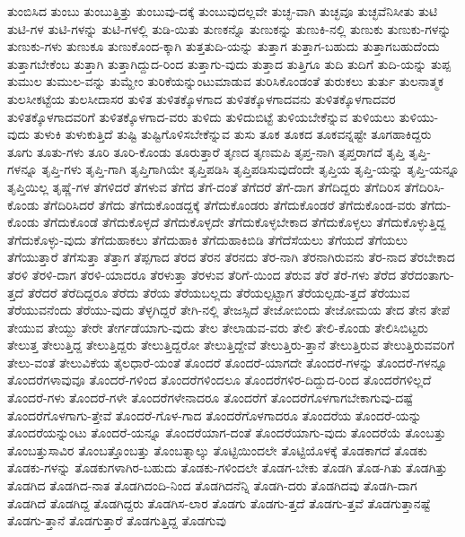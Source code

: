 {ತುಂಬಿಸಿದ
ತುಂಬು
ತುಂಬುತ್ತಿತ್ತು
ತುಂಬುವು-ದಕ್ಕೆ
ತುಂಬುವುದಲ್ಲವೇ
ತುಚ್ಛ-ವಾಗಿ
ತುಚ್ಛವೂ
ತುಚ್ಛವೆನಿಸೀತು
ತುಟಿ
ತುಟಿ-ಗಳ
ತುಟಿ-ಗಳನ್ನು
ತುಟಿ-ಗಳಲ್ಲಿ
ತುಡಿ-ಯಿತು
ತುಣಕನ್ನೊ
ತುಣುಕನ್ನು
ತುಣುಕಿ-ನಲ್ಲಿ
ತುಣುಕು
ತುಣುಕು-ಗಳನ್ನು
ತುಣುಕು-ಗಳು
ತುಣುಕೂ
ತುಣುಕೊಂದ-ಕ್ಕಾಗಿ
ತುತ್ತತುದಿ-ಯನ್ನು
ತುತ್ತಾಗ
ತುತ್ತಾಗ-ಬಹುದು
ತುತ್ತಾಗಬಹುದೆಂದು
ತುತ್ತಾಗಬೇಕೆಂಬ
ತುತ್ತಾಗಿ
ತುತ್ತಾಗಿದ್ದುದ-ರಿಂದ
ತುತ್ತಾಗು-ವುದು
ತುತ್ತಾದ
ತುತ್ತಿಗೂ
ತುದಿ
ತುದಿಗೆ
ತುದಿ-ಯನ್ನು
ತುಪ್ಪ
ತುಮುಲ
ತುಮುಲ-ವನ್ನು
ತುಮ್ಹೇಂ
ತುರಿಕೆಯನ್ನುಂಟುಮಾಡುವ
ತುರಿಸಿಕೊಂಡಂತೆ
ತುರುಕಲು
ತುರ್ತು
ತುಲನಾತ್ಮಕ
ತುಲಸೀಕಟ್ಟೆಯ
ತುಲಸೀದಾಸರ
ತುಳಿತ
ತುಳಿತಕ್ಕೊಳಗಾದ
ತುಳಿತಕ್ಕೊಳಗಾದವನು
ತುಳಿತಕ್ಕೊಳಗಾದವರ
ತುಳಿತಕ್ಕೊಳಗಾದವರಿಗೆ
ತುಳಿತಕ್ಕೊಳಗಾದ-ವರು
ತುಳಿದು
ತುಳಿದುಬಿಟ್ಟೆ
ತುಳಿಯಬೇಕೆನ್ನುವ
ತುಳಿಯಲು
ತುಳಿಯು-ವುದು
ತುಳುಕಿ
ತುಳುಕುತ್ತಿದೆ
ತುಷ್ಟಿ
ತುಷ್ಟಿಗೊಳಿಸಬೇಕೆನ್ನುವ
ತುಸು
ತೂಕ
ತೂಕದ
ತೂಕವನ್ನಷ್ಟೇ
ತೂಗಹಾಕಿದ್ದರು
ತೂಗು
ತೂತು-ಗಳು
ತೂರಿ
ತೂರಿ-ಕೊಂಡು
ತೂರುತ್ತಾರೆ
ತೃಣದ
ತೃಣಮಪಿ
ತೃಪ್ತ-ನಾಗಿ
ತೃಪ್ತರಾಗದೆ
ತೃಪ್ತಿ
ತೃಪ್ತಿ-ಗಳನ್ನೂ
ತೃಪ್ತಿ-ಗಳು
ತೃಪ್ತಿ-ಗಾಗಿ
ತೃಪ್ತಿಗಾಗಿಯೇ
ತೃಪ್ತಿಪಡಿಸಿ
ತೃಪ್ತಿಪಡಿಸುವುದೆಂದೇ
ತೃಪ್ತಿಯ
ತೃಪ್ತಿ-ಯನ್ನು
ತೃಪ್ತಿ-ಯನ್ನೂ
ತೃಪ್ತಿಯಿಲ್ಲ
ತೃಷ್ಣೆ-ಗಳ
ತೆಗಳಿದರೆ
ತೆಗಳುವ
ತೆಗೆದ
ತೆಗೆ-ದಂತೆ
ತೆಗೆದರೆ
ತೆಗೆ-ದಾಗ
ತೆಗೆದಿದ್ದರು
ತೆಗೆದಿರಿಸ
ತೆಗೆದಿರಿಸಿ-ಕೊಂಡು
ತೆಗೆದಿರಿಸಿದರೆ
ತೆಗೆದು
ತೆಗೆದುಕೊಂಡದ್ದಕ್ಕೆ
ತೆಗೆದುಕೊಂಡರು
ತೆಗೆದುಕೊಂಡರೆ
ತೆಗೆದುಕೊಂಡ-ವರು
ತೆಗೆದು-ಕೊಂಡು
ತೆಗೆದುಕೊಂಡೆ
ತೆಗೆದುಕೊಳ್ಳದೆ
ತೆಗೆದುಕೊಳ್ಳದೇ
ತೆಗೆದುಕೊಳ್ಳಬೇಕಾದ
ತೆಗೆದುಕೊಳ್ಳಲು
ತೆಗೆದುಕೊಳ್ಳುತ್ತಿದ್ದ
ತೆಗೆದುಕೊಳ್ಳು-ವುದು
ತೆಗೆದುಹಾಕಲು
ತೆಗೆದುಹಾಕಿ
ತೆಗೆದುಹಾಕಿಬಿಡಿ
ತೆಗೆದೆಸೆಯಲು
ತೆಗೆಯದೆ
ತೆಗೆಯಲು
ತೆಗೆಯುತ್ತಾರೆ
ತೆಗೆಸುತ್ತಾ
ತೆತ್ತಾಗ
ತೆಪ್ಪಗಾದ
ತೆರದ
ತೆರನ
ತೆರನದು
ತೆರ-ನಾಗಿ
ತೆರನಾಗಿರುವನು
ತೆರ-ನಾದ
ತೆರಬೇಕಾದ
ತೆರಳಿ
ತೆರಳಿ-ದಾಗ
ತೆರಳಿ-ಯಾದರೂ
ತೆರಳುತ್ತಾ
ತೆರಳುವ
ತೆರಿಗೆ-ಯಿಂದ
ತೆರುವ
ತೆರೆ
ತೆರೆ-ಗಳು
ತೆರೆದ
ತೆರೆದಂತಾಗು-ತ್ತದೆ
ತೆರೆದರೆ
ತೆರೆದಿದ್ದರೂ
ತೆರೆದು
ತೆರೆಯ
ತೆರೆಯಬಲ್ಲದು
ತೆರೆಯಲ್ಪಟ್ಟಾಗ
ತೆರೆಯಲ್ಪಡು-ತ್ತದೆ
ತೆರೆಯುವ
ತೆರೆಯುವನೆಂದು
ತೆರೆಯು-ವುದು
ತೆಳ್ಳಗಿದ್ದರೆ
ತೇಗಿ-ನಲ್ಲಿ
ತೇಜಸ್ಸಿದೆ
ತೇಜೋಬಿಂದು
ತೇಜೋಮಯ
ತೇದ
ತೇನ
ತೇಪೆ
ತೇಯುವ
ತೇಯ್ದು
ತೇರೇ
ತೇರ್ಗಡೆಯಾಗು-ವುದು
ತೇಲ
ತೇಲಾಡುವ-ವರು
ತೇಲಿ
ತೇಲಿ-ಕೊಂಡು
ತೇಲಿಸಿಬಿಟ್ಟರು
ತೇಲುತ್ತ
ತೇಲುತ್ತಿದ್ದ
ತೇಲುತ್ತಿದ್ದರು
ತೇಲುತ್ತಿದ್ದರೋ
ತೇಲುತ್ತಿದ್ದೇವೆ
ತೇಲುತ್ತಿರು-ತ್ತಾನೆ
ತೇಲುತ್ತಿರುವ
ತೇಲುತ್ತಿರುವವರಿಗೆ
ತೇಲು-ವಂತೆ
ತೇಲುವಿಕೆಯ
ತೈಲಧಾರೆ-ಯಂತೆ
ತೊಂದರೆ
ತೊಂದರೆ-ಯಾಗದೇ
ತೊಂದರೆ-ಗಳನ್ನು
ತೊಂದರೆ-ಗಳನ್ನೂ
ತೊಂದರೆಗಳಾವುವೂ
ತೊಂದರೆ-ಗಳಿಂದ
ತೊಂದರೆಗಳಿಂದಲೂ
ತೊಂದರೆಗಳಿರ-ದಿದ್ದುದ-ರಿಂದ
ತೊಂದರೆಗಳಿಲ್ಲದೆ
ತೊಂದರೆ-ಗಳು
ತೊಂದರೆ-ಗಳೇ
ತೊಂದರೆಗಳೇನಾದರೂ
ತೊಂದರೆಗೆ
ತೊಂದರೆಗೊಳಗಾಗಬೇಕಾಗುವು-ದಷ್ಟೆ
ತೊಂದರೆಗೊಳಗಾಗು-ತ್ತೇವೆ
ತೊಂದರೆ-ಗೊಳ-ಗಾದ
ತೊಂದರೆಗೊಳಗಾದರೂ
ತೊಂದರೆಯ
ತೊಂದರೆ-ಯನ್ನು
ತೊಂದರೆಯನ್ನುಂಟು
ತೊಂದರೆ-ಯನ್ನೂ
ತೊಂದರೆಯಾಗ-ದಂತೆ
ತೊಂದರೆಯಾಗು-ವುದು
ತೊಂದರೆಯೆ
ತೊಂಬತ್ತು
ತೊಂಬತ್ತುಸಾವಿರ
ತೊಂಬತ್ತೊಂಬತ್ತು
ತೊಂಬತ್ನಾಲ್ಕು
ತೊಟ್ಟಿಯಿಂದಲೇ
ತೊಟ್ಟಿಯೊಳಕ್ಕೆ
ತೊಡಕಾಗದೆ
ತೊಡಕು
ತೊಡಕು-ಗಳನ್ನು
ತೊಡಕುಗಳಾಗಿರ-ಬಹುದು
ತೊಡಕು-ಗಳಿಂದಲೇ
ತೊಡಗ-ಬೇಕು
ತೊಡಗಿ
ತೊಡ-ಗಿತು
ತೊಡಗಿತ್ತು
ತೊಡಗಿದ
ತೊಡಗಿದ-ನಾತ
ತೊಡಗಿದಂದಿ-ನಿಂದ
ತೊಡಗಿದನೆನ್ನಿ
ತೊಡಗಿ-ದರು
ತೊಡಗಿದವು
ತೊಡಗಿ-ದಾಗ
ತೊಡಗಿದೆ
ತೊಡಗಿದ್ದ
ತೊಡಗಿದ್ದರು
ತೊಡಗಿಸ-ಲಾರ
ತೊಡಗು
ತೊಡಗು-ತ್ತದೆ
ತೊಡಗು-ತ್ತವೆ
ತೊಡಗುತ್ತಾನಷ್ಟೆ
ತೊಡಗು-ತ್ತಾನೆ
ತೊಡಗುತ್ತಾರೆ
ತೊಡಗುತ್ತಿದ್ದ
ತೊಡಗುವು
}
